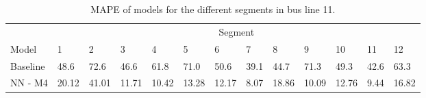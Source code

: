 \begin{table}[H]
	\centering
	\caption{MAPE of models for the different segments in bus line 11.}
	\label{fig:model-mape-of-segs-211}
	\begin{adjustbox}{center}
	\begin{tabular}{ l | l | l | l | l | l | l | l | l | l | l | l | l}
		& \multicolumn{12}{c}{Segment} \\
		Model       & 1 & 2 & 3 & 4 & 5 & 6 & 7 & 8 & 9 & 10 & 11 & 12 \\
		\hline
		Baseline  & 48.6 & 72.6 & 46.6 & 61.8 & 71.0 & 50.6 & 39.1 & 44.7 & 71.3 & 49.3  & 42.6 & 63.3 \\
		NN - M4         & 20.12& 41.01& 11.71& 10.42& 13.28& 12.17& 8.07& 18.86& 10.09& 12.76& 9.44& 16.82\\
	\end{tabular}
	\end{adjustbox}
\end{table}





